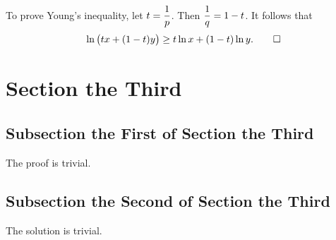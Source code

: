 To prove Young's inequality, let \(\displaystyle t = \frac{1}{p}\). Then \(\displaystyle
\frac{1}{q} = 1 - t\). It follows that
\[
    \ln \big(t x + (1 - t) y \big) \ge t \ln x + (1 - t) \ln y. \qedhere
\]
\Epr

\section{Section the Third}

\Bxr[Euler]
\kant[6]
\Exr

\subsection{Subsection the First of Section the Third}

\Bpr
The proof is trivial.
\Epr

\subsection{Subsection the Second of Section the Third}

\Bsl[Riemann]
The solution is trivial.
\Esl

\Edc
